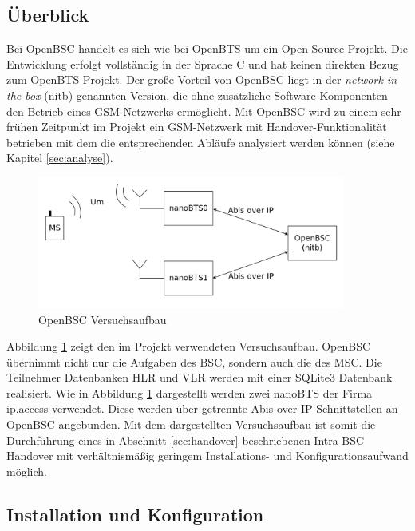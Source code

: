 \label{sec:openbsc}

\subsection{Überblick}

Bei OpenBSC handelt es sich wie bei OpenBTS um ein Open Source Projekt. Die Entwicklung erfolgt vollständig in der Sprache C und hat keinen direkten Bezug zum OpenBTS Projekt. Der große Vorteil von OpenBSC liegt in der \textit{network in the box} (nitb) genannten Version, die ohne zusätzliche Software-Komponenten den Betrieb eines GSM-Netzwerks ermöglicht. Mit OpenBSC wird zu einem sehr frühen Zeitpunkt im Projekt ein GSM-Netzwerk mit Handover-Funktionalität betrieben mit dem die entsprechenden Abläufe analysiert werden können (siehe Kapitel \ref{sec:analyse}).

\begin{figure}[h!]
  \centering
  \includegraphics[width=0.9\textwidth]{img/openbscarch}
  \caption{OpenBSC Versuchsaufbau}
  \label{fig:openbscarch}
\end{figure}

Abbildung \ref{fig:openbscarch} zeigt den im Projekt verwendeten Versuchsaufbau. OpenBSC übernimmt nicht nur die Aufgaben des BSC, sondern auch die des MSC. Die Teilnehmer Datenbanken HLR und VLR werden mit einer SQLite3 Datenbank realisiert. Wie in Abbildung \ref{fig:openbscarch} dargestellt werden zwei nanoBTS der Firma ip.access verwendet. Diese werden über getrennte Abis-over-IP-Schnittstellen an OpenBSC angebunden. Mit dem dargestellten Versuchsaufbau ist somit die Durchführung eines in Abschnitt \ref{sec:handover} beschriebenen Intra BSC Handover mit verhältnismäßig geringem Installations- und Konfigurationsaufwand möglich.

\subsection{Installation und Konfiguration}

